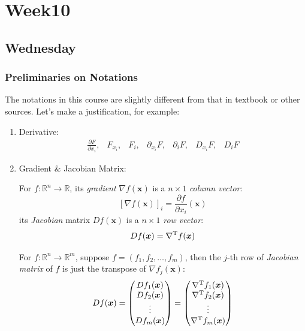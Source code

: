 
\chapter{Week10}

\section{Wednesday}
\subsection{Preliminaries on Notations}
The notations in this course are slightly different from that in textbook or other sources. Let's make a justification, for example:
\begin{enumerate}
\item
Derivative:
\[
\begin{array}{lllllll}
\frac{\partial F}{\partial x_i},
&
F_{x_i},
&
F_i,
&
\partial_{x_i}F,
&
\partial_iF,
&
D_{x_i}F,
&
D_iF
\end{array}
\]
\item
Gradient $\&$ Jacobian Matrix:
\begin{definition}[Gradient]
For $f:\mathbb{R}^n\to\mathbb{R}$, its \emph{gradient} $\nabla f(\bm x)$ is a $n\times1$ \emph{column vector}:
\[
[\nabla f(\bm x)]_i=\frac{\partial f}{\partial x_i}(\bm x)
\]
its \emph{Jacobian} matrix $Df(\bm x)$ is a $n\times1$ \emph{row vector}:
\[
Df(\bm x)=\nabla^{\mathrm T} f(\bm x)
\]
\end{definition}
\begin{definition}
For $f:\mathbb{R}^n\to\mathbb{R}^m$, suppose $f=(f_1,f_2,\dots,f_m)$, then the $j$-th row of \emph{Jacobian matrix} of $f$ is just the transpose of $\nabla f_j(\bm x)$: 
\[
Df(\bm x)=\begin{pmatrix}
Df_1(\bm x)\\Df_2(\bm x)\\\vdots\\Df_m(\bm x)
\end{pmatrix}=\begin{pmatrix}
\nabla^{\mathrm T} f_1(\bm x)\\
\nabla^{\mathrm T} f_2(\bm x)\\
\vdots\\
\nabla^{\mathrm T} f_m(\bm x)\\
\end{pmatrix}
\]
\end{definition}
\end{enumerate}

